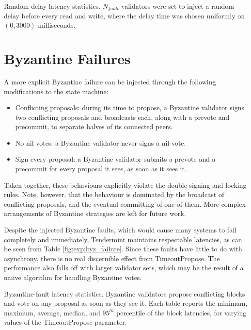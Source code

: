 \begin{table}[]
	
	\caption[Latency statistics under randomized delays]{Random delay latency statistics. $N_{fault}$ validators were set to inject a random delay
before every read and write, where the delay time was chosen uniformly on $(0, 3000)$ milliseconds.}
	\label{fig:exp:delay}
\end{table}


\section{Byzantine Failures}

A more explicit Byzantine failure can be injected through the following modifications
to the state machine:

\begin{itemize}
\item{Conflicting proposals: during its time to propose, a Byzantine validator signs two conflicting proposals and broadcasts each, along with a prevote and precommit, to separate halves of its connected peers.} 
\item{No nil votes: a Byzantine validator never signs a nil-vote.}
\item{Sign every proposal: a Byzantine validator submits a prevote and a precommit for every proposal it sees, as soon as it sees it.}
\end{itemize}

Taken together, these behaviours explicitly violate the double signing and locking rules. 
Note, however, that the behaviour is dominated by the broadcast of conflicting proposals,
and the eventual committing of one of them.
More complex arrangements of Byzantine strategies are left for future work.
 
Despite the injected Byzantine faults, 
which would cause many systems to fail completely and immediately,
Tendermint maintains respectable latencies, as can be seen from Table \ref{fig:exp:byz_failure}.
Since these faults have little to do with asynchrony,
there is no real discernible effect from TimeoutPropose.
The performance also falls off with larger validator sets,
which may be the result of a naiive algorithm for handling Byzantine votes.

\begin{table}[]
	
	\caption[Latency statistics under byzantine faults]{Byzantine-fault latency statistics.
Byzantine validators propose conflicting blocks and vote on any proposal as soon as they see it.
Each table reports the minimum, maximum, average, median, and $95^{th}$ percentile of the block latencies, for varying values of the TimeoutPropose parameter.}
	\label{fig:exp:byz_failure}
\end{table}

